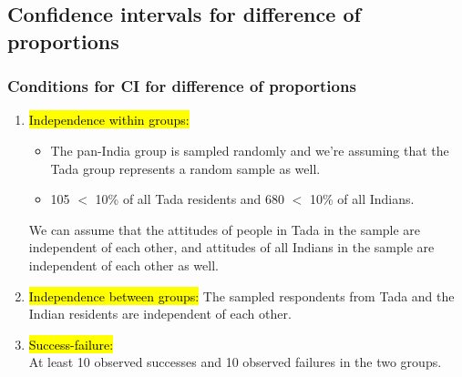 \documentclass[notes,11pt, aspectratio=169]{beamer}
\begin{document}

\subsection{Confidence intervals for difference of proportions}


\begin{frame}
\frametitle{Conditions for CI for difference of proportions}

\begin{enumerate}

\item \hl{Independence within groups: }
\begin{itemize}
\item The pan-India group is sampled randomly and we're assuming that the Tada group represents a random sample as well.
\pause
\item 105 $<$ 10\% of all Tada residents and 680 $<$ 10\% of all Indians.
\end{itemize}
\pause
We can assume that the attitudes of people in Tada in the sample are independent of each other, and attitudes of all Indians in the sample are independent of each other as well.

\pause

\item \hl{Independence between groups: }
The sampled respondents from Tada and the Indian residents are independent of each other.

\pause

\item \hl{Success-failure:} \\
At least 10 observed successes and 10 observed failures in the two groups.

\end{enumerate}

\end{frame}

\end{document}
